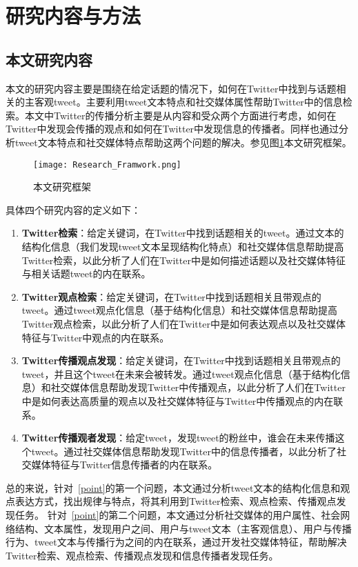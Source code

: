 \section{研究内容与方法}

\subsection{本文研究内容}
本文的研究内容主要是围绕在给定话题的情况下，如何在Twitter中找到与话题相关的主客观tweet。主要利用tweet文本特点和社交媒体属性帮助Twitter中的信息检索。本文中Twitter的传播分析主要是从内容和受众两个方面进行考虑，如何在Twitter中发现会传播的观点和如何在Twitter中发现信息的传播者。同样也通过分析tweet文本特点和社交媒体特点帮助这两个问题的解决。参见图\ref{Research_Framwork}本文研究框架。

\begin{figure}[htp]
\centering
\texttt{[image: Research\_Framwork.png]}
\caption{本文研究框架}
\label{Research_Framwork}
\end{figure}

具体四个研究内容的定义如下：

\begin{enumerate}
\item \textbf{Twitter检索}：给定关键词，在Twitter中找到话题相关的tweet。通过文本的结构化信息（我们发现tweet文本呈现结构化特点）和社交媒体信息帮助提高Twitter检索，以此分析了人们在Twitter中是如何描述话题以及社交媒体特征与相关话题tweet的内在联系。
\item \textbf{Twitter观点检索}：给定关键词，在Twitter中找到话题相关且带观点的tweet。通过tweet观点化信息（基于结构化信息）和社交媒体信息帮助提高Twitter观点检索，以此分析了人们在Twitter中是如何表达观点以及社交媒体特征与Twitter中观点的内在联系。
\item \textbf{Twitter传播观点发现}：给定关键词，在Twitter中找到话题相关且带观点的tweet，并且这个tweet在未来会被转发。通过tweet观点化信息（基于结构化信息）和社交媒体信息帮助发现Twitter中传播观点，以此分析了人们在Twitter中是如何表达高质量的观点以及社交媒体特征与Twitter中传播观点的内在联系。
\item \textbf{Twitter传播观者发现}：给定tweet，发现tweet的粉丝中，谁会在未来传播这个tweet。通过社交媒体信息帮助发现Twitter中的信息传播者，以此分析了社交媒体特征与Twitter信息传播者的内在联系。
\end{enumerate}

总的来说，针对~\ref{point}的第一个问题，本文通过分析tweet文本的结构化信息和观点表达方式，找出规律与特点，将其利用到Twitter检索、观点检索、传播观点发现任务。
针对~\ref{point}的第二个问题，本文通过分析社交媒体的用户属性、社会网络结构、文本属性，发现用户之间、用户与tweet文本（主客观信息）、用户与传播行为、tweet文本与传播行为之间的内在联系，通过开发社交媒体特征，帮助解决Twitter检索、观点检索、传播观点发现和信息传播者发现任务。

